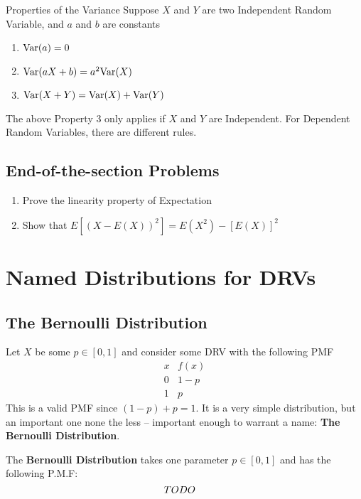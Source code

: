 \documentclass{report}
\begin{document}
\begin{theorem}{Properties of the Variance}
    Suppose $X$ and $Y$ are two Independent Random Variable, and $a$ and $b$ are constants
    \begin{enumerate}
        \item $\text{Var}(a)=0$
        \item $\text{Var}(aX+b)=a^2\text{Var}(X)$
        \item $\text{Var}(X+Y)=\text{Var}(X)+\text{Var}(Y)$
    \end{enumerate}
\end{theorem}

\begin{notsofast}
    The above Property 3 only applies if $X$ and $Y$ are Independent. For Dependent Random Variables, there are different rules.
\end{notsofast}


\subsection*{End-of-the-section Problems}
\begin{enumerate}
    \item Prove the linearity property of Expectation
    \item Show that $E[(X-E(X))^2]=E(X^2)-[E(X)]^2$
\end{enumerate}

\section{Named Distributions for DRVs}
\subsection{The Bernoulli Distribution}
Let $X$ be some $p\in[0,1]$ and consider some DRV with the following PMF
\[
    \begin{array}{c|c}
         x & f(x) \\
         \hline
         0 & 1-p \\
         1 & p
    \end{array}
\]
This is a valid PMF since $(1-p)+p=1$. It is a very simple distribution, but an important one none the less -- important enough to warrant a name: \textbf{The Bernoulli Distribution}. 


\newpage


The \textbf{Bernoulli Distribution} takes one parameter $p\in[0,1]$ and has the following P.M.F:
\[
    TODO\quad
\]
\end{document}

